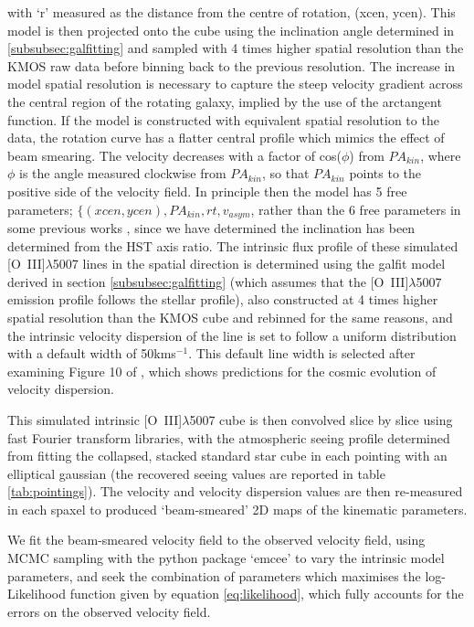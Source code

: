 \documentclass[fleqn,usenatbib]{mn2e}
\begin{document}
\noindent
with `r' measured as the distance from the centre of rotation, (xcen, ycen).
This model is then projected onto the cube using the inclination angle determined in \cref{subsubsec:galfitting} and sampled with 4 times higher spatial resolution than the KMOS raw data before binning back to the previous resolution.
The increase in model spatial resolution is necessary to capture the steep velocity gradient across the central region of the rotating galaxy, implied by the use of the arctangent function.
If the model is constructed with equivalent spatial resolution to the data, the rotation curve has a flatter central profile which mimics the effect of beam smearing.
The velocity decreases with a factor of cos($\phi$) from $PA_{kin}$, where $\phi$ is the angle measured clockwise from $PA_{kin}$, so that $PA_{kin}$ points to the positive side of the velocity field.
In principle then the model has 5 free parameters; $\{(xcen, ycen), PA_{kin}, rt, v_{asym}$, rather than the 6 free parameters in some previous works \citep[e.g.][]{Stott2016}, since we have determined the inclination has been determined from the HST axis ratio.
The intrinsic flux profile of these simulated [O~{\sc III}]$\lambda$5007 lines in the spatial direction is determined using the galfit model derived in section \cref{subsubsec:galfitting} (which assumes that the [O~{\sc III}]$\lambda$5007 emission profile follows the stellar profile), also constructed at 4 times higher spatial resolution than the KMOS cube and rebinned for the same reasons, and the intrinsic velocity dispersion of the line is set to follow a uniform distribution with a default width of 50kms$^{-1}$.
This default line width is selected after examining Figure 10 of \cite{Wisnioski2015}, which shows predictions for the cosmic evolution of velocity dispersion.

This simulated intrinsic [O~{\sc III}]$\lambda$5007 cube is then convolved slice by slice using fast Fourier transform libraries, with the atmospheric seeing profile determined from fitting the collapsed, stacked standard star cube in each pointing with an elliptical gaussian (the recovered seeing values are reported in table \ref{tab:pointings}).
The velocity and velocity dispersion values are then re-measured in each spaxel to produced `beam-smeared' 2D maps of the kinematic parameters.

We fit the beam-smeared velocity field to the observed velocity field, using MCMC sampling with the python package `emcee' \citep{Foreman-Mackey2013} to vary the intrinsic model parameters, and seek the combination of parameters which maximises the log-Likelihood function given by equation \ref{eq:likelihood}, which fully accounts for the errors on the observed velocity field.
\end{document}
